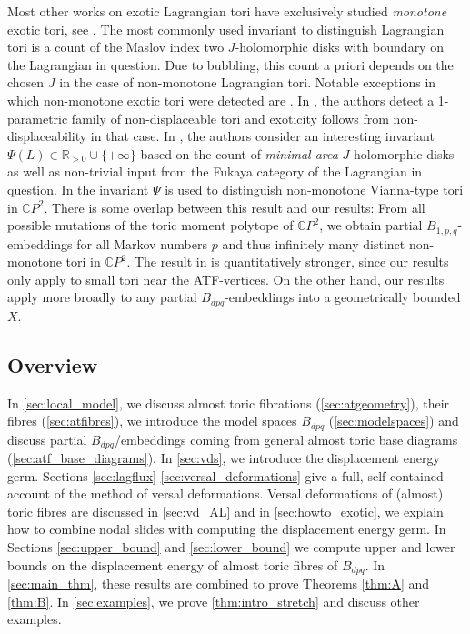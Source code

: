 \documentclass[12pt,a4paper,abstract=true,draft]{scrartcl}
\begin{document}
Most other works on exotic Lagrangian tori have exclusively studied \emph{monotone} exotic tori, see \cite{Aur15, Che96, CheSch10, EliPol97, GalMik22, Via17, Via16}.
The most commonly used invariant to distinguish Lagrangian tori is a count of the Maslov index two $J$-holomorphic disks with boundary on the Lagrangian in question.
Due to bubbling, this count a priori depends on the chosen $J$ in the case of non-monotone Lagrangian tori.
Notable exceptions in which non-monotone exotic tori were detected are \cite{FOOO12, SheTonVia19}.
In \cite{FOOO12}, the authors detect a 1-parametric family of non-displaceable tori and exoticity follows from non-displaceability in that case.
In \cite{SheTonVia19}, the authors consider an interesting invariant $\Psi(L) \in \mathbb{R}_{>0} \cup \{+\infty\}$ based on the count of \emph{minimal area} $J$-holomorphic disks as well as non-trivial input from the Fukaya category of the Lagrangian in question.
In \cite[Section 7]{SheTonVia19} the invariant $\Psi$ is used to distinguish non-monotone Vianna-type tori in $\mathbb{C}P^2$.
There is some overlap between this result and our results:
From all possible mutations of the toric moment polytope of $\mathbb{C}P^2$, we obtain partial $B_{1,p,q}$-embeddings for all Markov numbers $p$ and thus infinitely many distinct non-monotone tori in $\mathbb{C}P^2$.
The result in \cite[Section 7]{SheTonVia19} is quantitatively stronger, since our results only apply to small tori near the ATF-vertices.
On the other hand, our results apply more broadly to any partial $B_{dpq}$-embeddings into a geometrically bounded $X$.

\subsection{Overview}

In \cref{sec:local_model}, we discuss almost toric fibrations (\cref{sec:atgeometry}), their fibres (\cref{sec:atfibres}), we introduce the model spaces $B_{dpq}$ (\cref{sec:modelspaces}) and discuss partial $B_{dpq}$\-/embeddings coming from general almost toric base diagrams (\cref{sec:atf_base_diagrams}).
In \cref{sec:vds}, we introduce the displacement energy germ.
Sections \cref{sec:lagflux}-\cref{sec:versal_deformations} give a full, self-contained account of the method of versal deformations.
Versal deformations of (almost) toric fibres are discussed in \cref{sec:vd_AL} and in \cref{sec:howto_exotic}, we explain how to combine nodal slides with computing the displacement energy germ.
In Sections \ref{sec:upper_bound} and \ref{sec:lower_bound} we compute upper and lower bounds on the displacement energy of almost toric fibres of $B_{dpq}$.
In \cref{sec:main_thm}, these results are combined to prove Theorems \ref{thm:A} and \ref{thm:B}.
In \cref{sec:examples}, we prove \cref{thm:intro_stretch} and discuss other examples.
\end{document}
